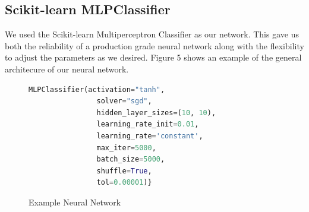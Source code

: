 \documentclass[12pt]{article}
\begin{document}
\subsection{Scikit-learn MLPClassifier}

We used the Scikit-learn Multiperceptron Classifier as our network. This gave us both the reliability of a production grade neural network along with the flexibility to adjust the parameters as we desired. Figure 5 shows an example of the general architecure of our neural network.

\begin{figure}[H]
\begin{lstlisting}[language=Python]
			MLPClassifier(activation="tanh",
				solver="sgd",
				hidden_layer_sizes=(10, 10),
				learning_rate_init=0.01,
				learning_rate='constant',
				max_iter=5000,
				batch_size=5000,
				shuffle=True,
				tol=0.00001)}
\end{lstlisting}
\caption{Example Neural Network}
\end{figure}
\end{document}
